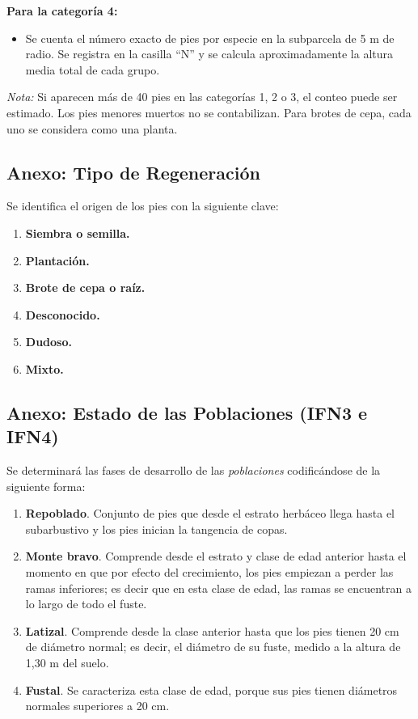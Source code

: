 \textbf{Para la categoría 4:}
\begin{itemize}
    \item Se cuenta el número exacto de pies por especie en la subparcela de 5 m de radio. Se registra en la casilla ``N'' y se calcula aproximadamente la altura media total de cada grupo.
\end{itemize}

\vspace{0.5em}

\textit{Nota:} Si aparecen más de 40 pies en las categorías 1, 2 o 3, el conteo puede ser estimado. Los pies menores muertos no se contabilizan. Para brotes de cepa, cada uno se considera como una planta.




\subsection*{Anexo: Tipo de Regeneración}\label{sec:TipoReg}

Se identifica el origen de los pies con la siguiente clave:

\begin{enumerate}
    \item \textbf{Siembra o semilla.}
    \item \textbf{Plantación.}
    \item \textbf{Brote de cepa o raíz.}
    \item \textbf{Desconocido.}
    \item \textbf{Dudoso.}
    \item \textbf{Mixto.}
\end{enumerate}


\subsection*{Anexo: Estado de las Poblaciones (IFN3 e IFN4)}\label{sec:EstadoIFN34}

Se determinará las fases de desarrollo de las \textit{poblaciones} codificándose de la siguiente forma:

\begin{enumerate}
    \item \textbf{Repoblado}. Conjunto de pies que desde el estrato herbáceo llega hasta el subarbustivo y los pies inician la tangencia de copas.
    \item \textbf{Monte bravo}. Comprende desde el estrato y clase de edad anterior hasta el momento en que por efecto del crecimiento, los pies empiezan a perder las ramas inferiores; es decir que en esta clase de edad, las ramas se encuentran a lo largo de todo el fuste.
    \item \textbf{Latizal}. Comprende desde la clase anterior hasta que los pies tienen 20 cm de diámetro normal; es decir, el diámetro de su fuste, medido a la altura de 1,30 m del suelo.
    \item \textbf{Fustal}. Se caracteriza esta clase de edad, porque sus pies tienen diámetros normales superiores a 20 cm.
\end{enumerate}


